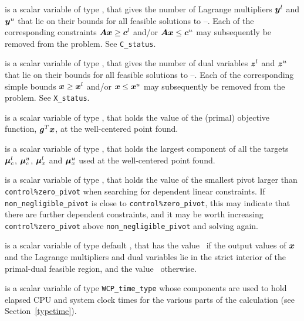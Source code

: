 \documentclass{galahad}
\newcommand{\packagename}{WCP}
\begin{document}
\begin{description}
 is a scalar variable of type \integer, that gives the
number of Lagrange multipliers ${\bm{y}}^l$ and ${\bm{y}}^u$ that lie on their bounds 
for all feasible solutions to --. Each of the
corresponding constraints ${\bm{A}} {\bm{x}} \geq {\bm{c}}^l$ and/or 
${\bm{A}} {\bm{x}} \leq {\bm{c}}^u$ may subsequently be removed from the problem.
See {\tt C\_status}.

 is a scalar variable of type \integer, that gives the
number of dual variables ${\bm{z}}^l$ and ${\bm{z}}^u$ that lie on their bounds 
for all feasible solutions to --. Each of the
corresponding simple bounds ${\bm{x}} \geq {\bm{x}}^l$ and/or 
${\bm{x}} \leq {\bm{x}}^u$ may subsequently be removed from the problem.
See {\tt X\_status}.

 is a scalar variable of type \realdp, that holds the
value of the (primal) objective function, ${\bm{g}}^T {\bm{x}}$, 
at the well-centered point found.

 is a scalar variable of type \realdp, 
that holds the largest component of all the targets
$\bm \mu_c^{l}$, $\bm \mu_c^{u}$, $\bm \mu_x^{l}$ and $\bm \mu_x^{u}$ used
at the well-centered point found.

 is a scalar variable of type \realdp, 
that holds the value of the smallest pivot larger than 
{\tt control\%zero\_pivot}
when searching for dependent linear constraints. If 
{\tt non\_negligible\_pivot} is close to  {\tt control\%zero\_pivot},
this may indicate that there are further dependent constraints, and
it may be worth increasing {\tt control\%zero\_pivot} above 
{\tt non\_negligible\_pivot} and solving again.

 is a scalar variable of type default \logical, that has the
value \true\ if the output values of ${\bm{x}}$ and the Lagrange multipliers and
dual variables lie in the strict interior of the primal-dual feasible
region, and the value \false\ otherwise.

 is a scalar variable of type {\tt \packagename\_time\_type} 
whose components are used to hold elapsed CPU and system clock times for 
the various parts of the calculation (see Section~\ref{typetime}).


\end{description}
\end{document}
